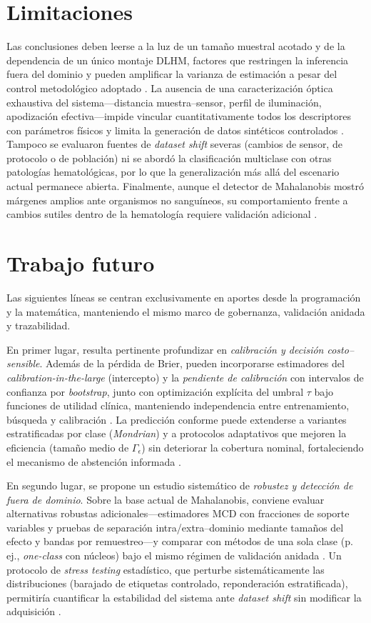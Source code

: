 \section*{Limitaciones}
Las conclusiones deben leerse a la luz de un tamaño muestral acotado y de la dependencia de un único montaje DLHM, factores que restringen la inferencia fuera del dominio y pueden amplificar la varianza de estimación a pesar del control metodológico adoptado \cite{Vabalas2019,Tsamardinos2022}. La ausencia de una caracterización óptica exhaustiva del sistema—distancia muestra–sensor, perfil de iluminación, apodización efectiva—impide vincular cuantitativamente todos los descriptores con parámetros físicos y limita la generación de datos sintéticos controlados \cite{Greenbaum2014}. Tampoco se evaluaron fuentes de \emph{dataset shift} severas (cambios de sensor, de protocolo o de población) ni se abordó la clasificación multiclase con otras patologías hematológicas, por lo que la generalización más allá del escenario actual permanece abierta. Finalmente, aunque el detector de Mahalanobis mostró márgenes amplios ante organismos no sanguíneos, su comportamiento frente a cambios sutiles dentro de la hematología requiere validación adicional \cite{Rousseeuw2019}.

\section*{Trabajo futuro}
Las siguientes líneas se centran exclusivamente en aportes desde la programación y la matemática, manteniendo el mismo marco de gobernanza, validación anidada y trazabilidad.

En primer lugar, resulta pertinente profundizar en \textit{calibración y decisión costo–sensible}. Además de la pérdida de Brier, pueden incorporarse estimadores del \emph{calibration-in-the-large} (intercepto) y la \emph{pendiente de calibración} con intervalos de confianza por \emph{bootstrap}, junto con optimización explícita del umbral \(\tau\) bajo funciones de utilidad clínica, manteniendo independencia entre entrenamiento, búsqueda y calibración \cite{Pedregosa2011,Tsamardinos2022}. La predicción conforme puede extenderse a variantes estratificadas por clase (\emph{Mondrian}) y a protocolos adaptativos que mejoren la eficiencia (tamaño medio de \(\Gamma_\epsilon\)) sin deteriorar la cobertura nominal, fortaleciendo el mecanismo de abstención informada \cite{Montero2024}.

En segundo lugar, se propone un estudio sistemático de \textit{robustez y detección de fuera de dominio}. Sobre la base actual de Mahalanobis, conviene evaluar alternativas robustas adicionales—estimadores MCD con fracciones de soporte variables y pruebas de separación intra/extra–dominio mediante tamaños del efecto y bandas por remuestreo—y comparar con métodos de una sola clase (p.\,ej., \emph{one-class} con núcleos) bajo el mismo régimen de validación anidada \cite{Rousseeuw2019,Mahalanobis1936,Pedregosa2011}. Un protocolo de \emph{stress testing} estadístico, que perturbe sistemáticamente las distribuciones (barajado de etiquetas controlado, reponderación estratificada), permitiría cuantificar la estabilidad del sistema ante \emph{dataset shift} sin modificar la adquisición \cite{Tsamardinos2022,Vabalas2019}.

